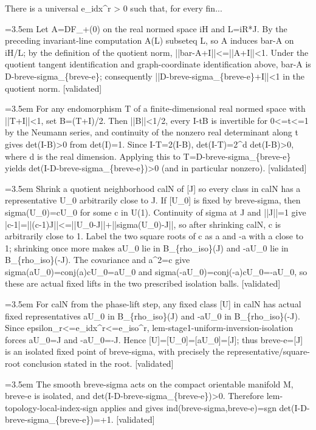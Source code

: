 \documentclass{article}
\newcommand{\step}[1]{\par\noindent\hangindent=3.5em\hangafter=1%
  \makebox[3.5em][l]{\textbf{#1.}}}
\newcommand{\steptag}[1]{\hfill{\small\textsf{[#1]}}}
\begin{document}
\begin{proofbox}{There is a universal e\_idx\textasciicircum{}r > 0 such that, for every fin...}
\step{1.4} Let A=DF\_+(0) on the real normed space iH and L=iR*J. By the preceding invariant-line computation A(L) subseteq L, so A induces bar-A on iH/L; by the definition of the quotient norm, ||bar-A+I||<=||A+I||<1. Under the quotient tangent identification and graph-coordinate identification above, bar-A is D-breve-sigma\_\{breve-e\}; consequently ||D-breve-sigma\_\{breve-e\}+I||<1 in the quotient norm. \steptag{validated} \\[4pt]
\step{1.5} For any endomorphism T of a finite-dimensional real normed space with ||T+I||<1, set B=(T+I)/2. Then ||B||<1/2, every I-tB is invertible for 0<=t<=1 by the Neumann series, and continuity of the nonzero real determinant along t gives det(I-B)>0 from det(I)=1. Since I-T=2(I-B), det(I-T)=2\textasciicircum{}d det(I-B)>0, where d is the real dimension. Applying this to T=D-breve-sigma\_\{breve-e\} yields det(I-D-breve-sigma\_\{breve-e\})>0 (and in particular nonzero). \steptag{validated} \\[4pt]
\step{1.6} Shrink a quotient neighborhood calN of [J] so every class in calN has a representative U\_0 arbitrarily close to J. If [U\_0] is fixed by breve-sigma, then sigma(U\_0)=cU\_0 for some c in U(1). Continuity of sigma at J and ||J||=1 give |c-1|=||(c-1)J||<=||U\_0-J||+||sigma(U\_0)-J||, so after shrinking calN, c is arbitrarily close to 1. Label the two square roots of c as a and -a with a close to 1; shrinking once more makes aU\_0 lie in B\_\{rho\_iso\}(J) and -aU\_0 lie in B\_\{rho\_iso\}(-J). The covariance and a\textasciicircum{}2=c give sigma(aU\_0)=conj(a)cU\_0=aU\_0 and sigma(-aU\_0)=conj(-a)cU\_0=-aU\_0, so these are actual fixed lifts in the two prescribed isolation balls. \steptag{validated} \\[4pt]
\step{1.7} For calN from the phase-lift step, any fixed class [U] in calN has actual fixed representatives aU\_0 in B\_\{rho\_iso\}(J) and -aU\_0 in B\_\{rho\_iso\}(-J). Since epsilon\_r<=e\_idx\textasciicircum{}r<=e\_iso\textasciicircum{}r, lem-stage1-uniform-inversion-isolation forces aU\_0=J and -aU\_0=-J. Hence [U]=[U\_0]=[aU\_0]=[J]; thus breve-e=[J] is an isolated fixed point of breve-sigma, with precisely the representative/square-root conclusion stated in the root. \steptag{validated} \\[4pt]
\step{1.8} The smooth breve-sigma acts on the compact orientable manifold M, breve-e is isolated, and det(I-D-breve-sigma\_\{breve-e\})>0. Therefore lem-topology-local-index-sign applies and gives ind(breve-sigma,breve-e)=sgn det(I-D-breve-sigma\_\{breve-e\})=+1. \steptag{validated} \\[4pt]
\end{proofbox}
\end{document}
